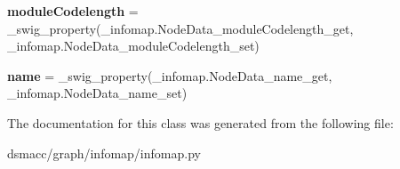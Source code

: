 \begin{DoxyCompactItemize}
\item 
\mbox{\label{classdsmacc_1_1graph_1_1infomap_1_1infomap_1_1NodeData_aed90d46755edf04f4a515ae691e419ef}} 
{\bfseries module\+Codelength} = \+\_\+swig\+\_\+property(\+\_\+infomap.\+Node\+Data\+\_\+module\+Codelength\+\_\+get, \+\_\+infomap.\+Node\+Data\+\_\+module\+Codelength\+\_\+set)
\item 
\mbox{\label{classdsmacc_1_1graph_1_1infomap_1_1infomap_1_1NodeData_a8f5fb47a32c9de374fdc354718b7ab86}} 
{\bfseries name} = \+\_\+swig\+\_\+property(\+\_\+infomap.\+Node\+Data\+\_\+name\+\_\+get, \+\_\+infomap.\+Node\+Data\+\_\+name\+\_\+set)
\end{DoxyCompactItemize}


The documentation for this class was generated from the following file\+:\begin{DoxyCompactItemize}
\item 
dsmacc/graph/infomap/infomap.\+py\end{DoxyCompactItemize}
